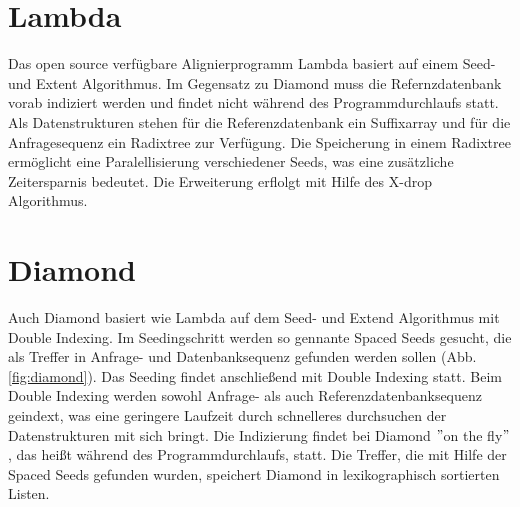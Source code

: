 \documentclass[10pt, a4paper]{report}[08.12.2015]
\begin{document}
   \section{\textrm{Lambda}}
   Das open source verf\"ugbare Alignierprogramm Lambda \cite{hauswedell2014} basiert auf einem Seed- und Extent Algorithmus. Im Gegensatz zu Diamond muss die Refernzdatenbank vorab indiziert werden und findet nicht w\"ahrend des Programmdurchlaufs statt. Als Datenstrukturen stehen f\"ur die Referenzdatenbank ein Suffixarray und f\"ur die Anfragesequenz ein Radixtree zur Verf\"ugung. Die Speicherung in einem Radixtree erm\"oglicht eine Paralellisierung verschiedener Seeds, was eine zus\"atzliche Zeitersparnis bedeutet. 
    Die Erweiterung erflolgt mit Hilfe des X-drop Algorithmus. 
    
    \section{\textrm{Diamond}}    
     Auch Diamond \cite{buchfink2014} basiert wie Lambda auf dem Seed- und Extend Algorithmus mit Double Indexing. Im Seedingschritt werden so gennante Spaced Seeds gesucht, die als Treffer in Anfrage- und Datenbanksequenz gefunden werden sollen (Abb.  \ref{fig:diamond}). Das Seeding findet anschlie{\ss}end mit Double Indexing statt. Beim Double Indexing werden sowohl Anfrage- als auch Referenzdatenbanksequenz geindext, was eine geringere Laufzeit durch schnelleres durchsuchen der Datenstrukturen mit sich bringt. Die Indizierung findet bei Diamond $"$on the fly$"$, das hei{\ss}t w\"ahrend des Programmdurchlaufs, statt. Die Treffer, die mit Hilfe der Spaced Seeds gefunden wurden, speichert Diamond in lexikographisch sortierten Listen.
\end{document}
